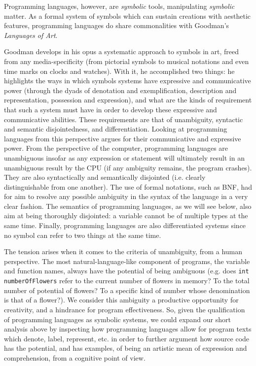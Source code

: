 Programming languages, however, are \emph{symbolic} tools, manipulating \emph{symbolic} matter. As a formal system of symbols which can sustain creations with aesthetic features, programming languages do share commonalities with Goodman's \emph{Languages of Art}.

Goodman develops in his opus a systematic approach to symbols in art, freed from any media-specificity (from pictorial symbols to musical notations and even time marks on clocks and watches). With it, he accomplished two things: he highlights the ways in which symbols systems have expressive and communicative power (through the dyads of denotation and exemplification, description and representation, possession and expression), and what are the kinds of requirement that such a system must have in order to develop these expressive and communicative abilities. These requirements are that of unambiguity, syntactic and semantic disjointedness, and differentiation\citep{goodman_languages_1976}. Looking at programming languages from this perspective argues for their communicative and expressive power. From the perspective of the computer, programming languages are unambiguous insofar as any expression or statement will ultimately result in an unambiguous result by the CPU (if any ambiguity remains, the program crashes). They are also syntactically and semantically disjointed (i.e. clearly distinguishable from one another). The use of formal notations, such as BNF, had for aim to resolve any possible ambiguity in the syntax of the language in a very clear fashion. The semantics of programming languages, as we will see below, also aim at being thoroughly disjointed: a variable cannot be of multiple types at the same time. Finally, programming languages are also differentiated systems since no symbol can refer to two things at the same time.

The tension arises when it comes to the criteria of unambiguity, from a human perspective. The most natural-language-like component of programs, the variable and function names, always have the potential of being ambiguous (e.g. does \lstinline{int numberOfFlowers} refer to the current number of flowers in memory? To the total number of potential of flowers? To a specific kind of number whose denomination is that of a flower?). We consider this ambiguity a productive opportunity for creativity, and a hindrance for program effectiveness. So, given the qualification of programming languages as symbolic systems, we could expand our short analysis above by inspecting how programming languages allow for program texts which denote, label, represent, etc. in order to further argument how source code has the potential, and has examples, of being an artistic mean of expression and comprehension, from a cognitive point of view.

